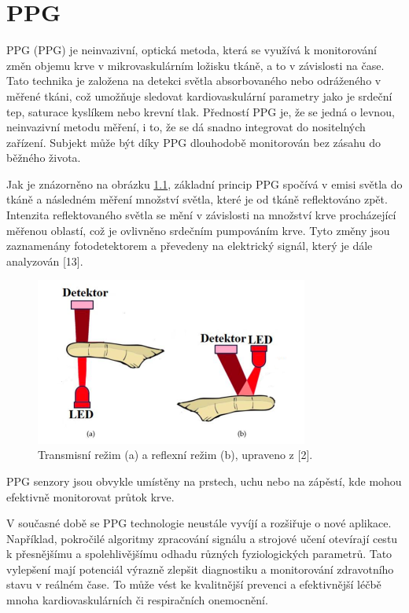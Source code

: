 \chapter{\acl{PPG}}

\acl{PPG} (\acs{PPG}) je neinvazivní, optická metoda, která se využívá k monitorování změn objemu krve v mikrovaskulárním ložisku tkáně, a to v závislosti na čase.
Tato technika je založena na detekci světla absorbovaného nebo odráženého v měřené tkáni, což umožňuje sledovat kardiovaskulární parametry jako je srdeční tep, saturace kyslíkem nebo krevní tlak.
Předností PPG je, že se jedná o levnou, neinvazivní metodu měření, i to, že se dá snadno integrovat do nositelných zařízení.
Subjekt může být díky PPG dlouhodobě monitorován bez zásahu do běžného života.

Jak je znázorněno na obrázku \ref{fig:snimaniPPG}, základní princip \acs{PPG} spočívá v emisi světla do tkáně a následném měření množství světla, které je od tkáně reflektováno zpět.
Intenzita reflektovaného světla se mění v závislosti na množství krve procházející měřenou oblastí, což je ovlivněno srdečním pumpováním krve.
Tyto změny jsou zaznamenány fotodetektorem a převedeny na elektrický signál, který je dále analyzován [13].

\begin{figure}[h]
	\centering
	\includegraphics[width=0.8\textwidth]{./obrazky/snimaniPPG.png}
	\caption{Transmisní režim (a) a reflexní režim (b), upraveno z [2].}
	\label{fig:snimaniPPG}
\end{figure}

\acs{PPG} senzory jsou obvykle umístěny na prstech, uchu nebo na zápěstí, kde mohou efektivně monitorovat průtok krve.

V současné době se \acs{PPG} technologie neustále vyvíjí a rozšiřuje o nové aplikace.
Například, pokročilé algoritmy zpracování signálu a strojové učení otevírají cestu k přesnějšímu a spolehlivějšímu odhadu různých fyziologických parametrů.
Tato vylepšení mají potenciál výrazně zlepšit diagnostiku a monitorování zdravotního stavu v reálném čase.
To může vést ke kvalitnější prevenci a efektivnější léčbě mnoha kardiovaskulárních či respiračních onemocnění.

